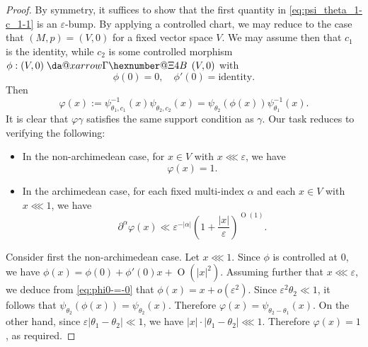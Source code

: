 \documentclass[reqno]{amsart}
\makeatletter
\newcommand*{\da@rightarrow}{\mathchar"0\hexnumber@\symAMSa 4B }
\newcommand*{\xdashrightarrow}[2][]{%
  \mathrel{%
    \mathpalette{\da@xarrow{#1}{#2}{}\da@rightarrow{\,}{}}{}%
  }%
}
\newcommand*{\da@xarrow}[7]{%
  \sbox0{$\ifx#7\scriptstyle\scriptscriptstyle\else\scriptstyle\fi#5#1#6\m@th$}%
  \sbox2{$\ifx#7\scriptstyle\scriptscriptstyle\else\scriptstyle\fi#5#2#6\m@th$}%
  \sbox4{$#7\dabar@\m@th$}%
  \dimen@=\wd0 %
  \ifdim\wd2 >\dimen@
    \dimen@=\wd2 %
  \fi
  \count@=2 %
  \def\da@bars{\dabar@\dabar@}%
  \@whiledim\count@\wd4<\dimen@\do{%
    \advance\count@\@ne
    \expandafter\def\expandafter\da@bars\expandafter{%
      \da@bars
      \dabar@ 
    }%
  }%
  \mathrel{#3}%
  \mathrel{%
    \mathop{\da@bars}\limits
    \ifx\\#1\\%
    \else
      _{\copy0}%
    \fi
    \ifx\\#2\\%
    \else
      ^{\copy2}%
    \fi
  }%
  \mathrel{#4}%
}
\def\eps{\varepsilon}
\def\O{\operatorname{O}}
\theoremstyle{plain} \newtheorem{theorem} {Theorem}
\theoremstyle{definition} \newtheorem{definition} [theorem] {Definition}
\theoremstyle{itplain} %
\numberwithin{equation}{section}
\numberwithin{theorem}{section}
\makeatother
\begin{document}
\begin{proof}
  By symmetry, it suffices to show that the first quantity in \eqref{eq:psi_theta_1-c_1-1} is an $\eps$-bump.  By applying a controlled chart, we may reduce to the case that $(M,p) = (V,0)$ for a fixed vector space $V$.  We may assume then that $c_1$ is the identity, while $c_2$ is some controlled morphism $\phi : (V,0) \xdashrightarrow{} (V,0)$ with
  \begin{equation}\label{eq:phi0-=-0}
    \phi(0) = 0, \quad \phi '(0) = \text{identity}.
  \end{equation}
  Then
  \begin{equation*}
    \varphi(x) := \psi_{\theta_1,c_1}^{-1}(x) \psi_{\theta_2,c_2}(x) = \psi_{\theta_2}(\phi(x)) \psi_{\theta_1}^{-1}(x).
  \end{equation*}
  It is clear that $\varphi \gamma$ satisfies the same support condition as $\gamma$.  Our task reduces to verifying the following:
  \begin{itemize}
  \item In the non-archimedean case, for $x \in V$ with $x \lll \eps$, we have
    \begin{equation*}
      \varphi(x) = 1.
    \end{equation*}
  \item In the archimedean case, for each fixed multi-index $\alpha$ and each $x \in V$ with $x \lll 1$, we have
    \begin{equation}\label{eq:part-varphi-x}
      \partial^{\alpha} \varphi (x)
      \ll \eps^{-|\alpha|} \left( 1 + \frac{|x|}{\eps} \right)^{\O(1)}.
    \end{equation}
  \end{itemize}


  Consider first the non-archimedean case.  Let $x \lll 1$.  Since $\phi$ is controlled at $0$, we have $\phi(x) = \phi(0) + \phi '(0) x + \O(|x|^2)$.  Assuming further that $x \lll \eps$, we deduce from \eqref{eq:phi0-=-0} that $\phi(x) = x + o(\eps^2)$.  Since $\eps^2 \theta_2 \ll 1$, it follows that $\psi_{\theta_2}(\phi(x)) = \psi_{\theta_2}(x)$.  Therefore $\varphi(x) = \psi_{\theta_2 - \theta_1}(x)$.  On the other hand, since $\eps |\theta_1 - \theta_2| \ll 1$, we have $|x| \cdot |\theta_1 - \theta_2| \lll 1$.  Therefore $\varphi(x) = 1$, as required.


\end{proof}
\end{document}

